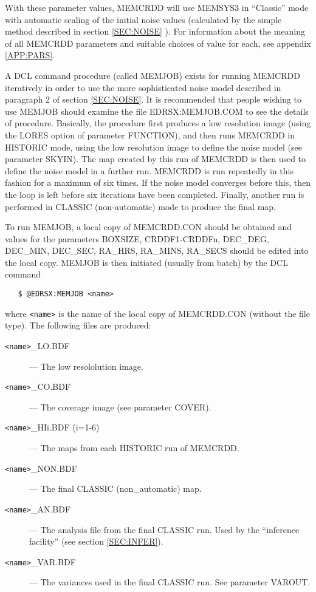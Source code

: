 With these parameter values, MEMCRDD will use MEMSYS3 in ``Classic'' mode with
automatic scaling of the initial noise values (calculated by the simple method
described in section \ref {SEC:NOISE} ). For information about the meaning of
all MEMCRDD parameters and suitable choices of value for each, see appendix
\ref {APP:PARS}.

A DCL command procedure (called MEMJOB) exists for running MEMCRDD iteratively
in order to use the more sophisticated noise model described in paragraph 2 of
section \ref {SEC:NOISE}. It is recommended that people wishing to use MEMJOB
should examine the file EDRSX:MEMJOB.COM to see the details of procedure.
Basically, the procedure first produces a low resolution image (using the LORES
option of parameter FUNCTION), and then runs MEMCRDD in HISTORIC mode, using
the low resolution image to define the noise model (see parameter SKYIN). The
map created by this run of MEMCRDD is then used to define the noise model in a
further run. MEMCRDD is run repeatedly in this fashion for a maximum of six
times. If the noise model converges before this, then the loop is left before
six iterations have been completed. Finally, another run is performed in
CLASSIC (non-automatic) mode to produce the final map.

To run MEMJOB, a local copy of MEMCRDD.CON should be obtained and values for
the parameters BOXSIZE, CRDDF1-CRDDFn, DEC\_DEG, DEC\_MIN, DEC\_SEC, RA\_HRS,
RA\_MINS, RA\_SECS should be edited into the local copy. MEMJOB is then
initiated (usually from batch) by the DCL command

\begin{verbatim}
   $ @EDRSX:MEMJOB <name>
\end{verbatim}

where \verb+<name>+ is the name of the local copy of MEMCRDD.CON (without the
file type). The following files are produced:

\begin{description}
\item [\verb+<name>+\_LO.BDF] --- The low resololution image.
\item [\verb+<name>+\_CO.BDF] --- The coverage image (see parameter COVER).
\item [\verb+<name>+\_HIi.BDF (i=1-6)] --- The maps from each HISTORIC run of
MEMCRDD.
\item [\verb+<name>+\_NON.BDF] --- The final CLASSIC (non\_automatic) map.
\item [\verb+<name>+\_AN.BDF] --- The analysis file from the final CLASSIC run.
Used by the ``inference facility'' (see section \ref {SEC:INFER}).
\item [\verb+<name>+\_VAR.BDF] --- The variances used in the final CLASSIC run.
See parameter VAROUT.
\end{description}

